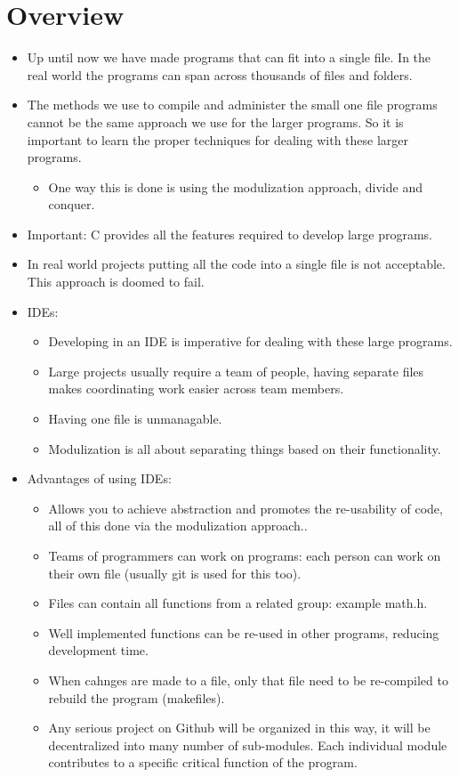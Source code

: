 \section{Overview}
\begin{itemize}
    \item Up until now we have made programs that can fit into a single file. In the real world the programs can span across thousands of files and folders.
    \item The methods we use to compile and administer the small one file programs cannot be the same approach we use for the larger programs. So it is important to learn the proper techniques for dealing with these larger programs.
        \begin{itemize}
            \item One way this is done is using the modulization approach, divide and conquer. 
        \end{itemize}
    
    \item Important: C provides all the features required to develop large programs.
    \item In real world projects putting all the code into a single file is not acceptable. This approach is doomed to fail.
    \item IDEs:
        \begin{itemize}
            \item Developing in an IDE is imperative for dealing with these large programs.
            \item Large projects usually require a team of people, having separate files makes coordinating work easier across team members.
            \item Having one file is unmanagable.
            \item Modulization is all about separating things based on their functionality.
        \end{itemize}
    
    \item Advantages of using IDEs:
        \begin{itemize}
            \item Allows you to achieve abstraction and promotes the re-usability of code, all of this done via the modulization approach..
            \item Teams of programmers can work on programs: each person can work on their own file (usually git is used for this too).
            \item Files can contain all functions from a related group: example math.h.
            \item Well implemented functions can be re-used in other programs, reducing development time.
            \item When cahnges are made to a file, only that file need to be re-compiled to rebuild the program (makefiles).
            \item Any serious project on Github will be organized in this way, it will be decentralized into many number of sub-modules. Each individual module contributes to a specific critical function of the program.
        \end{itemize}
    

\end{itemize}
